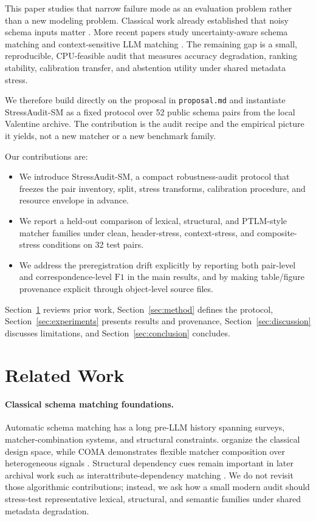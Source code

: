 \documentclass{article}
\newcommand{\stressaudit}{StressAudit-SM}
\newcommand{\fone}{\mbox{$\mathrm{F1}$}}
\begin{document}
This paper studies that narrow failure mode as an evaluation problem rather than a new modeling problem. Classical work already established that noisy schema inputs matter \citep{he2005holistic}. More recent papers study uncertainty-aware schema matching \citep{feng2024promptmatcher} and context-sensitive LLM matching \citep{chen2026construm}. The remaining gap is a small, reproducible, CPU-feasible audit that measures accuracy degradation, ranking stability, calibration transfer, and abstention utility under shared metadata stress.

We therefore build directly on the proposal in \texttt{proposal.md} and instantiate \stressaudit{} as a fixed protocol over 52 public schema pairs from the local Valentine archive. The contribution is the audit recipe and the empirical picture it yields, not a new matcher or a new benchmark family.

Our contributions are:
\begin{itemize}[leftmargin=*,topsep=2pt,itemsep=2pt]
  \item We introduce \stressaudit, a compact robustness-audit protocol that freezes the pair inventory, split, stress transforms, calibration procedure, and resource envelope in advance.
  \item We report a held-out comparison of lexical, structural, and PTLM-style matcher families under clean, header-stress, context-stress, and composite-stress conditions on 32 test pairs.
  \item We address the preregistration drift explicitly by reporting both pair-level and correspondence-level \fone{} in the main results, and by making table/figure provenance explicit through object-level source files.
\end{itemize}

Section~\ref{sec:related} reviews prior work, Section~\ref{sec:method} defines the protocol, Section~\ref{sec:experiments} presents results and provenance, Section~\ref{sec:discussion} discusses limitations, and Section~\ref{sec:conclusion} concludes.

\section{Related Work}
\label{sec:related}

\paragraph{Classical schema matching foundations.}
Automatic schema matching has a long pre-LLM history spanning surveys, matcher-combination systems, and structural constraints. \citet{rahm2001survey} organize the classical design space, while COMA demonstrates flexible matcher composition over heterogeneous signals \citep{do2002coma}. Structural dependency cues remain important in later archival work such as interattribute-dependency matching \citep{kang2008interattribute}. We do not revisit those algorithmic contributions; instead, we ask how a small modern audit should stress-test representative lexical, structural, and semantic families under shared metadata degradation.
\end{document}
